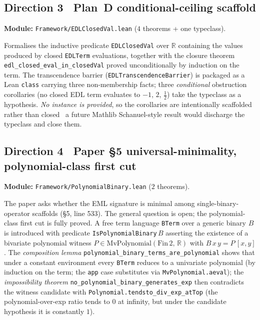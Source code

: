 \documentclass[11pt]{article}
\theoremstyle{plain}
\theoremstyle{definition}
\begin{document}
\subsection*{Direction 3 \textemdash\ Plan~D conditional-ceiling
scaffold}

\noindent\textbf{Module:} \texttt{Framework/EDLClosedVal.lean} ($4$
theorems + one typeclass).

Formalises the inductive predicate \texttt{EDLClosedVal} over $\mathbb{R}$
containing the values produced by closed \texttt{EDLTerm} evaluations,
together with the closure theorem
\texttt{edl\_closed\_eval\_in\_closedVal} proved unconditionally by
induction on the term. The transcendence barrier
(\texttt{EDLTranscendenceBarrier}) is packaged as a Lean
\texttt{class} carrying three non-membership facts; three
\emph{conditional} obstruction corollaries (no closed EDL term
evaluates to $-1$, $2$, $\frac12$) take the typeclass as a hypothesis.
\emph{No instance is provided}, so the corollaries are intentionally
scaffolded rather than closed \textemdash\ a future Mathlib
Schanuel-style result would discharge the typeclass and close them.

\subsection*{Direction 4 \textemdash\ Paper \S5 universal-minimality,
polynomial-class first cut}

\noindent\textbf{Module:} \texttt{Framework/PolynomialBinary.lean}
($2$ theorems).

The paper asks whether the EML signature is minimal among
single-binary-operator scaffolds (\S5, line 533). The general
question is open; the polynomial-class first cut is fully proved.
A free term language \texttt{BTerm} over a generic binary $B$ is
introduced with predicate \texttt{IsPolynomialBinary}\,$B$ asserting
the existence of a bivariate polynomial witness
$P \in \mathrm{MvPolynomial}(\mathrm{Fin}\,2,\,\mathbb{R})$ with
$B\,x\,y = P\,[x, y]$. The \emph{composition lemma}
\texttt{polynomial\_binary\_terms\_are\_polynomial} shows that under
a constant environment every \texttt{BTerm} reduces to a univariate
polynomial (by induction on the term; the \texttt{app} case
substitutes via \texttt{MvPolynomial.aeval}); the
\emph{impossibility theorem}
\texttt{no\_polynomial\_binary\_generates\_exp} then contradicts the
witness candidate with
\texttt{Polynomial.tendsto\_div\_exp\_atTop} (the polynomial-over-exp
ratio tends to $0$ at infinity, but under the candidate hypothesis it
is constantly $1$).
\end{document}
